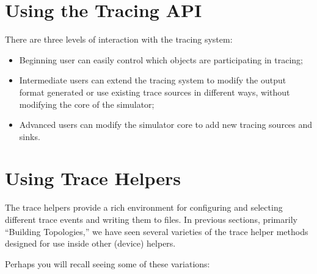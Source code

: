 \documentclass[letterpaper,10pt,english]{sphinxmanual}
\begin{document}
\section{Using the Tracing API}
\label{\detokenize{tracing:using-the-tracing-api}}
There are three levels of interaction with the tracing system:
\begin{itemize}
\item {} 
Beginning user can easily control which objects are participating in tracing;

\item {} 
Intermediate users can extend the tracing system to modify the output format
generated or use existing trace sources in different ways, without modifying
the core of the simulator;

\item {} 
Advanced users can modify the simulator core to add new tracing sources and
sinks.

\end{itemize}


\section{Using Trace Helpers}
\label{\detokenize{tracing:using-trace-helpers}}
The  trace helpers provide a rich environment for configuring and selecting
different trace events and writing them to files. In previous sections,
primarily “Building Topologies,” we have seen several varieties of the trace
helper methods designed for use inside other (device) helpers.

Perhaps you will recall seeing some of these variations:

\begin{sphinxVerbatim}[commandchars=\\\{\}]
 
     
    
  
\end{sphinxVerbatim}
\end{document}

